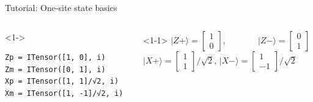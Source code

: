 \begin{frame}[fragile]{Tutorial: One-site state basics}

\begin{columns}

\begin{column}[T]{0.45\textwidth}
\begin{onlyenv}<1->
\begin{lstlisting}[language=JuliaLocal, style=julia, basicstyle=\scriptsize\ttfamily]
Zp = ITensor([1, 0], i)
Zm = ITensor([0, 1], i)
Xp = ITensor([1, 1]/√2, i) 
Xm = ITensor([1, -1]/√2, i) 
\end{lstlisting}
\end{onlyenv}
\end{column}

\begin{column}[T]{0.6\textwidth}
\begin{onlyenv}<1-1>
$|Z+\rangle = \begin{bmatrix} 1 \\ 0 \end{bmatrix}$,
\ \ \ \ \ \ \  $|Z-\rangle = \begin{bmatrix} 0 \\ 1 \end{bmatrix}$ \\
$|X+\rangle = \begin{bmatrix} 1 \\ 1 \end{bmatrix}/\sqrt{2}$,
  $|X-\rangle = \begin{bmatrix} 1 \\ -1 \end{bmatrix}/\sqrt{2}$
\end{onlyenv}


\end{column}
\end{columns}
\end{frame}
